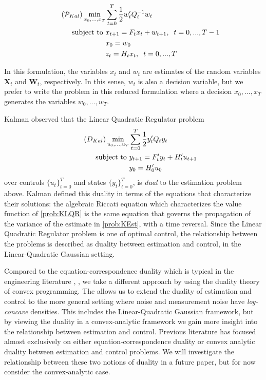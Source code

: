 \documentclass[12pt]{article}
\renewcommand{\vec}[1]{\mathbf{#1}}
\theoremstyle{remark}
\theoremstyle{remark}
\begin{document}
\begin{align*} \label{prob:KEst} \tag{$\mathcal{P}_{Kal}$} 
\min_{x_{0},...,x_{T}} & \sum_{t=0}^{T}  \frac{1}{2} w_{t}' Q_{t}^{-1}
w_{t} \\
\text{subject to } & x_{t+1} = F_{t} x_{t} + w_{t+1}, \; \;
t=0,...,T-1\\
&x_{0} = w_{0} \\
& z_{t} = H_{t} x_{t}, \; \; t=0,...,T
\end{align*}

In this formulation, the variables $x_{t}$ and $w_{t}$ are estimates
of the random variables $\vec{X}_{t}$ and $\vec{W}_{t}$, respectively.
In this sense, $w_{t}$ is also a decision variable, but we prefer to
write the problem in this reduced formulation where a decision
$x_{0},...,x_{T}$ generates the variables $w_{0},...,w_{T}$.

Kalman observed that the Linear Quadratic Regulator problem
\begin{align*} \label{prob:KLQR} \tag{$D_{Kal}$}
\min_{u_{0},...,u_{T}} &\sum_{t=0}^{T}  \frac{1}{2} y_{t}' Q_{t} y_{t} \\ 
\text{subject to } & y_{t+1} = F_{t}' y_{t} + H_{t}' u_{t+1} \\
& y_{0} = H_{0}' u_{0}
\end{align*}
over controls $\{u_{t}\}_{t=0}^{T}$ and states $\{y_{t}\}_{t=0}^{T}$,
is \emph{dual} to the estimation problem above. Kalman defined this
duality in terms of the equations that characterize their solutions:
the algebraic Riccati equation which characterizes the value function of
\eqref{prob:KLQR} is the same equation that governs the propagation of
the variance of the estimate in \eqref{prob:KEst}, with a
time reversal. Since the Linear Quadratic Regulator problem is one of
optimal control, the relationship between the problems is
described as duality between estimation and control, in the
Linear-Quadratic Gaussian setting.

Compared to the equation-correspondence duality which is typical in
the engineering literature \cite{Todorov},
\cite{LinEstControl} , we take a different approach by 
using the duality theory of convex programming. The allows us to
extend the duality of estimation and control to the more general
setting where noise and measurement noise have \emph{log-concave}
densities. This includes the Linear-Quadratic Gaussian 
framework, but by viewing the duality in a convex-analytic
framework we gain more insight into the relationship between
estimation and control. Previous literature has focused almost
exclusively on either equation-correspondence duality or convex
analytic duality between estimation and control problems. We will
investigate the relationship 
between these two notions of duality in a future paper, but for now
consider the convex-analytic case.
\end{document}

